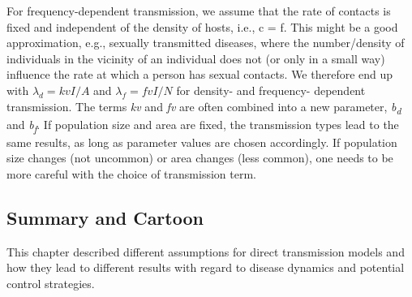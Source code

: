 \documentclass[]{article}
\theoremstyle{definition}
\theoremstyle{definition}
\theoremstyle{definition}
\theoremstyle{remark}
\begin{document}
For frequency-dependent transmission, we assume that the rate of
contacts is fixed and independent of the density of hosts, i.e., c = f.
This might be a good approximation, e.g., sexually transmitted diseases,
where the number/density of individuals in the vicinity of an individual
does not (or only in a small way) influence the rate at which a person
has sexual contacts. We therefore end up with \(\lambda_d= kv I/A\) and
\(\lambda_f= fv I/N\) for density- and frequency- dependent
transmission. The terms \emph{kv} and \emph{fv} are often combined into
a new parameter, \emph{b\textsubscript{d}} and
\emph{b\textsubscript{f}}. If population size and area are fixed, the
transmission types lead to the same results, as long as parameter values
are chosen accordingly. If population size changes (not uncommon) or
area changes (less common), one needs to be more careful with the choice
of transmission term.

\subsection{Summary and Cartoon}\label{summary-and-cartoon-5}

This chapter described different assumptions for direct transmission
models and how they lead to different results with regard to disease
dynamics and potential control strategies.
\end{document}
